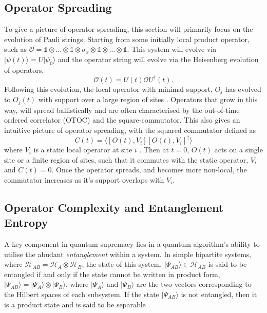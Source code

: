 \subsection{Operator Spreading} 
To give a picture of operator spreading, this section will primarily focus on the evolution of Pauli strings. Starting from some initially local product operator, such as 
$\mathcal{O} = \mathbb{1} \otimes\dots \otimes \mathbb{1} \otimes \sigma_{x} \otimes \mathbb{1} \otimes \dots \otimes \mathbb{1}$. This system will evolve via $|\psi (t)\rangle = U |\psi_0\rangle$ and the operator string will evolve via the Heisenberg evolution of operators, 
\begin{equation}\label{heisenberg_evolution}
    \mathcal{O}(t) = U(t) \mathcal{O} U^{\dagger}(t).
\end{equation}
 Following this evolution, the local operator with minimal support, $O_j$ has evolved to $O_j(t)$ with support over a
large region of sites \cite{Khemani_2018}. Operators that grow in this way, will spread ballistically \cite{Roberts_2015, Lieb:1972wy, Schuster_2022} and are often
characterised by the out-of-time ordered correlator (OTOC) \cite{Xu2022} and the square-commutator\cite{Blake_2018}. This also gives an
intuitive picture of operator spreading, with the squared commutator defined as 
\begin{equation}
  C(t) = \langle [O(t), V_i][O(t), V_i]^{\dagger}\rangle
\end{equation}
where $V_i$ is a static local operator at site $i$ \cite{https://doi.org/10.48550/arxiv.1804.08655}. Then at $t=0$, $O(t)$
acts on a single site or a finite region of sites, such that it commutes with the static operator, $V_i$ and $C(t) = 0$.
Once the operator spreads, and becomes more non-local, the commutator increases as it's support overlaps with $V_i$.


\subsection{Operator Complexity and Entanglement Entropy}
A key component in quantum supremacy lies in a quantum algorithm's ability to utilise the abudant \textit{entanglement} within a system. In simple bipartite systems, where $\mathcal{H}_{AB} = \mathcal{H}_{A}\otimes \mathcal{H}_{B}$, the state of this system, $|\Psi_{AB}\rangle \in \mathcal{H}_{AB}$ is 
said to be entangled if and only if the state cannot be written in product form, $|\Psi_{AB}\rangle =  |\Psi_{A}\rangle \otimes |\Psi_{B}\rangle$, where $|\Psi_{A}\rangle$ and $|\Psi_{B}\rangle$ are the two vectors corresponding to the Hilbert spaces of each subsystem. If the state $|\Psi_{AB}\rangle$ is not entangled, then it is a product state and is said to be separable \cite{Horodecki_2009}.
 

